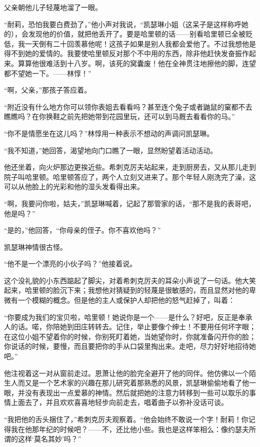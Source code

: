 \par 父亲朝他儿子轻蔑地溜了一眼。
\par “耐莉，恐怕我要白费劲了，”他小声对我说，“凯瑟琳小姐（这呆子是这样称呼她的），会发现他的价值，就把他丢开了。要是哈里顿的话——别看哈里顿已全被贬低，我一天倒有二十回羡慕他呢！这孩子如果是别人我都会爱他了。不过我想他是得不到她的爱情的。我要使哈里顿反对那个不中用的东西，除非他赶快发奋振作起来。算算他很难活到十八岁。啊，该死的窝囊废！他在全神贯注地擦他的脚，连望都不望她一下。——林惇！”
\par “啊，父亲，”那孩子答应着。
\par “附近没有什么地方你可以领你表姐去看看吗？甚至连个兔子或者鼬鼠的窠都不去瞧瞧吗？在你换鞋之前先把她带到花园里玩，还可以到马厩去看看你的马。”
\par “你不是情愿坐在这儿吗？”林惇用一种表示不想动的声调问凯瑟琳。
\par “我不知道，”她回答，渴望地向门口瞧了一眼，显然盼望着活动活动。
\par 他还坐着，向火炉那边更挨近些。希刺克厉夫站起来，走到厨房去，又从那儿走到院子叫哈里顿。哈里顿答应了，两个人立刻又进来了。那个年轻人刚洗完了澡，这可以从他脸上的光彩和他的湿头发看得出来。
\par “啊，我要问你啦，姑夫，”凯瑟琳喊着，记起了那管家的话，“那不是我的表哥吧，他是吗？”
\par “是的，”他回答，“你母亲的侄子。你不喜欢他吗？”
\par 凯瑟琳神情很古怪。
\par “他不是一个漂亮的小伙子吗？”他接着说。
\par 这个没礼貌的小东西踮起了脚尖，对着希刺克厉夫的耳朵小声说了一句话。他大笑起来，哈里顿的脸沉下来；我想他对猜疑到的轻蔑是很敏感的，而且显然对他的卑微有一个模糊的概念。但是他的主人或保护人却把他的怒气赶掉了，叫着：
\par “你要成为我们的宝贝啦，哈里顿！她说你是一个——是什么？好吧，反正是奉承人的话。喏，你陪她到田庄转转去。记住，举止要像个绅士！不要用任何坏字眼；在这位小姐不望着你的时候，你别死盯着她，当她望你时，你就准备闪开你的脸；你说话的时候，要慢，而且要把你的手从口袋里掏出来。走吧，尽力好好地招待她吧。”
\par 他注视着这一对从窗前走过。恩萧让他的脸完全避开了他的同伴。他仿佛以一个陌生人而又是一个艺术家的兴趣在那儿研究着那熟悉的风景，凯瑟琳偷偷地看了他一眼，并没有表现出一点爱慕的神情。然后就把她的注意力转移到一些可以取乐的事情上面去了，并且欢欢喜喜地轻步向前走去，唱着曲子以弥补没话可谈。
\par “我把他的舌头捆住了，”希刺克厉夫观察着。“他会始终不敢说一个字！耐莉！你记得我在他那年纪的时候吧？——不，还比他小些。我也是这样笨相么：像约瑟夫所谓的这样‘莫名其妙’吗？”
